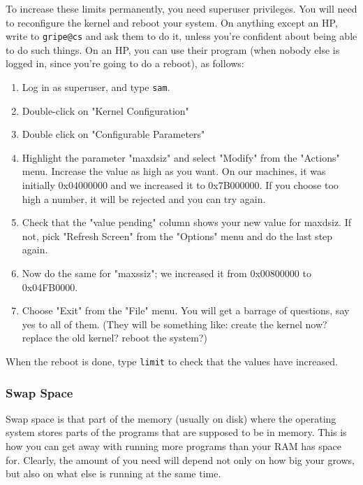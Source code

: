To increase these limits permanently, you need superuser privileges. You will need to reconfigure the
kernel and reboot your system. On anything except an HP, write to {\tt gripe@cs} and ask them to do it,
unless you're confident about being able to do such things. On an HP, you can use their 
program (when nobody else is logged in, since you're going to do a reboot), as follows:
\begin{enumerate}
\item Log in as superuser, and type {\tt sam}.

\item Double-click on "Kernel Configuration"

\item  Double click on "Configurable Parameters"

\item Highlight the parameter "maxdsiz" and select "Modify" from the "Actions" menu.
Increase the value as high as you want. On our machines, it was initially 
0x04000000 and we increased it to 0x7B000000. If you choose too high a number,
it will be rejected and you can try again.

\item Check that the "value pending" column shows your new value for maxdsiz. If not,
pick "Refresh Screen" from the "Options" menu and do the last step again.

\item Now do the same for "maxssiz"; we increased it from 0x00800000 to
0x04FB0000.

\item Choose "Exit" from the "File" menu. You will get a barrage of questions, say
yes to all of them. (They will be something like: create the kernel now? 
replace the old kernel? reboot the system?)
\end{enumerate}

When the reboot is done, type {\tt limit} to check that the values have increased.

\subsubsection{Swap Space}
Swap space is that part of the memory (usually on disk) where the operating system
stores parts of the programs that are supposed to be in memory. This is how you 
can get away with running more programs than your RAM has space for.
Clearly, the amount of  you need will depend not only on how big
your \TPS grows, but also on what else is running at the same time.

